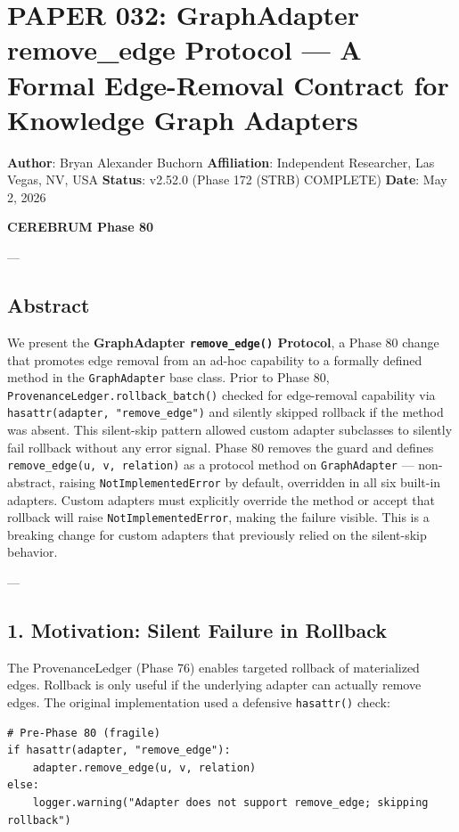 \section{PAPER 032: GraphAdapter remove\_edge Protocol — A Formal Edge-Removal Contract for Knowledge Graph Adapters}

\textbf{Author}: Bryan Alexander Buchorn  
\textbf{Affiliation}: Independent Researcher, Las Vegas, NV, USA  
\textbf{Status}: v2.52.0 (Phase 172 (STRB) COMPLETE)
\textbf{Date}: May 2, 2026

\textbf{CEREBRUM Phase 80}

---

\subsection{Abstract}

We present the \textbf{GraphAdapter \texttt{remove\_edge()} Protocol}, a Phase 80 change that promotes edge removal from an ad-hoc capability to a formally defined method in the \texttt{GraphAdapter} base class. Prior to Phase 80, \texttt{ProvenanceLedger.rollback\_batch()} checked for edge-removal capability via \texttt{hasattr(adapter, "remove\_edge")} and silently skipped rollback if the method was absent. This silent-skip pattern allowed custom adapter subclasses to silently fail rollback without any error signal. Phase 80 removes the guard and defines \texttt{remove\_edge(u, v, relation)} as a protocol method on \texttt{GraphAdapter} — non-abstract, raising \texttt{NotImplementedError} by default, overridden in all six built-in adapters. Custom adapters must explicitly override the method or accept that rollback will raise \texttt{NotImplementedError}, making the failure visible. This is a breaking change for custom adapters that previously relied on the silent-skip behavior.

---

\subsection{1. Motivation: Silent Failure in Rollback}

The ProvenanceLedger (Phase 76) enables targeted rollback of mater\-ialized edges. Rollback is only useful if the underlying adapter can actually remove edges. The original imple\-mentation used a defensive \texttt{hasattr()} check:

\begin{lstlisting}
# Pre-Phase 80 (fragile)
if hasattr(adapter, "remove_edge"):
    adapter.remove_edge(u, v, relation)
else:
    logger.warning("Adapter does not support remove_edge; skipping rollback")
\end{lstlisting}

